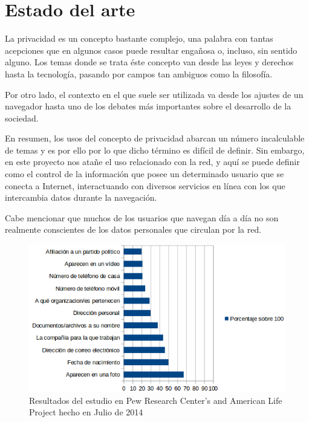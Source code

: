 \chapter{Estado del arte}
\label{chap:estadodelarte}

\label{sec:conceptos}
La privacidad es un concepto bastante complejo, una palabra con tantas
acepciones que en algunos casos puede resultar engañosa o, incluso,
sin sentido alguno. Los temas donde se trata éste concepto van desde
las leyes y derechos hasta la tecnología, pasando por campos tan
ambiguos como la filosofía. 

Por otro lado, el contexto en el que suele ser utilizada va desde los
ajustes de un navegador hasta uno de los debates más importantes sobre
el desarrollo de la sociedad.

En resumen, los usos del concepto de privacidad abarcan un número
incalculable de temas y es por ello por lo que dicho término es
difícil de definir.  Sin embargo, en este proyecto nos atañe el uso
relacionado con la red, y aquí se puede definir como el control de la
información que posee un determinado usuario que se conecta a
Internet, interactuando con diversos servicios en línea con los que
intercambia datos durante la navegación.

Cabe mencionar que muchos de los usuarios que navegan día a día no son
realmente conscientes de los datos personales que circulan por la red.

\begin{figure}[h]
	\centerline{
		\mbox{\includegraphics[width=5.00in]{images/chart_privacy.png}}
	}
	\caption{Resultados del estudio en Pew Research Center's and American Life Project hecho en Julio de 2014}
	\label{fig:norm_Daugman}
\end{figure}

